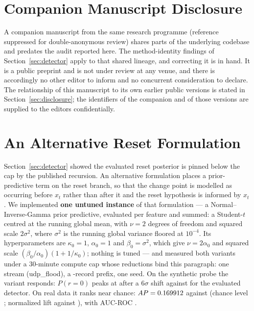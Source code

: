 \documentclass[manuscript,anonymous,review]{acmart}
\begin{document}
\section*{Companion Manuscript Disclosure}
A companion manuscript from the same research programme (reference suppressed
for double-anonymous review) shares parts of the underlying codebase and
predates the audit reported here. The method-identity findings of
Section~\ref{sec:detector} apply to that shared lineage, and correcting it is
in hand. It is a public preprint and is not under review at any venue, and
there is accordingly no other editor to inform and no concurrent consideration
to declare. The relationship of this manuscript to its own earlier public
versions is stated in Section~\ref{sec:disclosure}; the identifiers of the
companion and of those versions are supplied to the editors confidentially.




\appendix

\section{An Alternative Reset Formulation}
\label{app:ablation}

Section~\ref{sec:detector} showed the evaluated reset posterior is pinned
below the cap by the published recursion. An alternative formulation places a
prior-predictive term on the reset branch, so that the change point is
modelled as occurring before $x_t$ rather than after it and the reset
hypothesis is informed by $x_t$. We implemented \textbf{one untuned instance}
of that formulation --- a Normal--Inverse-Gamma prior predictive, evaluated per
feature and summed: a Student-$t$ centred at the running global mean, with
$\nu{=}2$ degrees of freedom and squared scale $2\sigma^2$, where $\sigma^2$ is
the running global variance floored at $10^{-4}$. Its hyperparameters are
$\kappa_0{=}1$, $\alpha_0{=}1$ and $\beta_0{=}\sigma^2$, which give
$\nu{=}2\alpha_0$ and squared scale $(\beta_0/\alpha_0)(1+1/\kappa_0)$; nothing
is tuned ---
and measured both variants under a 30-minute compute cap whose reductions bind
this paragraph: one stream (udp\_flood), a \SSixPrefixRows-record prefix, one
seed. On the synthetic probe the variant responds: $P(r{=}0)$ peaks at
\SSixProbeCorrectedPeak{} after a $6\sigma$ shift against
\SSixProbeOriginalPeak{} for the evaluated detector. On real data it ranks near
chance: $AP=0.169912$ against \SSixOriginalAucpr{} (chance level
\SSixChanceFloor; normalized lift \SSixCorrectedNormLift{} against
\SSixOriginalNormLift), with AUC-ROC \SSixCorrectedAucroc.
\end{document}
